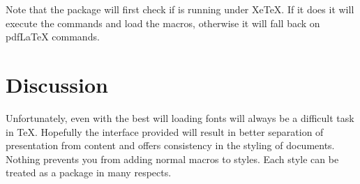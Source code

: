 Note that the package will first check if is running under XeTeX. If it does it will execute the commands and load the macros, otherwise it will fall back on pdfLaTeX commands.

\section{Discussion}


Unfortunately, even with the best will loading fonts will always be a difficult task in TeX. Hopefully the interface provided will result in better separation of presentation from content and offers consistency in the styling of documents. Nothing prevents you from adding normal macros to styles. Each style can be treated as a package in many respects.

\@specialfalse
